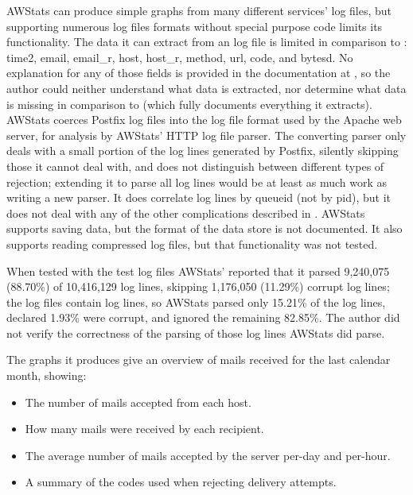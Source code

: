 AWStats can produce simple graphs from many different services' log files,
but supporting numerous log files formats without special purpose code
limits its functionality.  The data it can extract from an 
log file is limited in comparison to \parsername{}: time2, email, email\_r,
host, host\_r, method, url, code, and bytesd.  No explanation for any of
those fields is provided in the documentation at
,
so the author could neither understand what data is extracted, nor
determine what data is missing in comparison to \parsername{} (which fully
documents everything it extracts).  AWStats coerces Postfix log files into
the log file format used by the Apache web server, for analysis by AWStats'
HTTP log file parser.  The converting parser only deals with a small
portion of the log lines generated by Postfix, silently skipping those it
cannot deal with, and does not distinguish between different types of
rejection; extending it to parse all log lines would be at least as much
work as writing a new parser.  It does correlate log lines by queueid (not
by pid), but it does not deal with any of the other complications described
in .  AWStats supports saving data, but the
format of the data store is not documented.  It also supports reading
compressed log files, but that functionality was not tested.

When tested with the \numberOFlogFILES{} test log files AWStats' reported
that it parsed 9,240,075 (88.70\%) of 10,416,129 log lines, skipping
1,176,050 (11.29\%) corrupt log lines; the \numberOFlogFILES{} log files
contain \numberOFlogLINES{} log lines, so AWStats parsed only 15.21\% of
the log lines, declared 1.93\% were corrupt, and ignored the remaining
82.85\%.  The author did not verify the correctness of the parsing of those
log lines AWStats did parse.

The graphs it produces give an overview of mails received for the last
calendar month, showing:

\begin{itemize}

    \item The number of mails accepted from each host.

    \item How many mails were received by each recipient.

    \item The average number of mails accepted by the server per-day and
        per-hour.

    \item A summary of the  codes used when rejecting
        delivery attempts.

\end{itemize}

